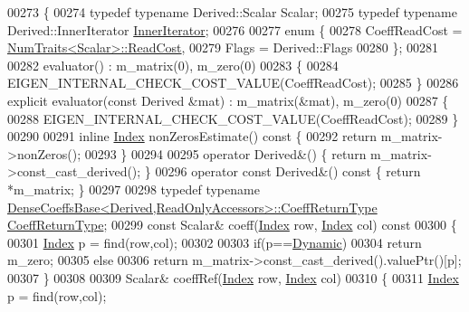 \begin{DoxyCode}
00273 \{
00274   \textcolor{keyword}{typedef} \textcolor{keyword}{typename} Derived::Scalar Scalar;
00275   \textcolor{keyword}{typedef} \textcolor{keyword}{typename} Derived::InnerIterator \hyperlink{class_eigen_1_1_inner_iterator}{InnerIterator};
00276   
00277   \textcolor{keyword}{enum} \{
00278     CoeffReadCost = \hyperlink{group___core___module_struct_eigen_1_1_num_traits}{NumTraits<Scalar>::ReadCost},
00279     Flags = Derived::Flags
00280   \};
00281   
00282   evaluator() : m\_matrix(0), m\_zero(0)
00283   \{
00284     EIGEN\_INTERNAL\_CHECK\_COST\_VALUE(CoeffReadCost);
00285   \}
00286   \textcolor{keyword}{explicit} evaluator(\textcolor{keyword}{const} Derived &mat) : m\_matrix(&mat), m\_zero(0)
00287   \{
00288     EIGEN\_INTERNAL\_CHECK\_COST\_VALUE(CoeffReadCost);
00289   \}
00290   
00291   \textcolor{keyword}{inline} \hyperlink{group___core___module_a554f30542cc2316add4b1ea0a492ff02}{Index} nonZerosEstimate()\textcolor{keyword}{ const }\{
00292     \textcolor{keywordflow}{return} m\_matrix->nonZeros();
00293   \}
00294   
00295   \textcolor{keyword}{operator} Derived&() \{ \textcolor{keywordflow}{return} m\_matrix->const\_cast\_derived(); \}
00296   \textcolor{keyword}{operator} \textcolor{keyword}{const} Derived&() \textcolor{keyword}{const} \{ \textcolor{keywordflow}{return} *m\_matrix; \}
00297   
00298   \textcolor{keyword}{typedef} \textcolor{keyword}{typename} \hyperlink{class_eigen_1_1_dense_coeffs_base}{DenseCoeffsBase<Derived,ReadOnlyAccessors>::CoeffReturnType}
       \hyperlink{class_eigen_1_1internal_1_1_tensor_lazy_evaluator_writable}{CoeffReturnType};
00299   \textcolor{keyword}{const} Scalar& coeff(\hyperlink{group___core___module_a554f30542cc2316add4b1ea0a492ff02}{Index} row, \hyperlink{group___core___module_a554f30542cc2316add4b1ea0a492ff02}{Index} col)\textcolor{keyword}{ const}
00300 \textcolor{keyword}{  }\{
00301     \hyperlink{group___core___module_a554f30542cc2316add4b1ea0a492ff02}{Index} p = find(row,col);
00302 
00303     \textcolor{keywordflow}{if}(p==\hyperlink{namespace_eigen_ad81fa7195215a0ce30017dfac309f0b2}{Dynamic})
00304       \textcolor{keywordflow}{return} m\_zero;
00305     \textcolor{keywordflow}{else}
00306       \textcolor{keywordflow}{return} m\_matrix->const\_cast\_derived().valuePtr()[p];
00307   \}
00308 
00309   Scalar& coeffRef(\hyperlink{group___core___module_a554f30542cc2316add4b1ea0a492ff02}{Index} row, \hyperlink{group___core___module_a554f30542cc2316add4b1ea0a492ff02}{Index} col)
00310   \{
00311     \hyperlink{group___core___module_a554f30542cc2316add4b1ea0a492ff02}{Index} p = find(row,col);

\end{DoxyCode}
